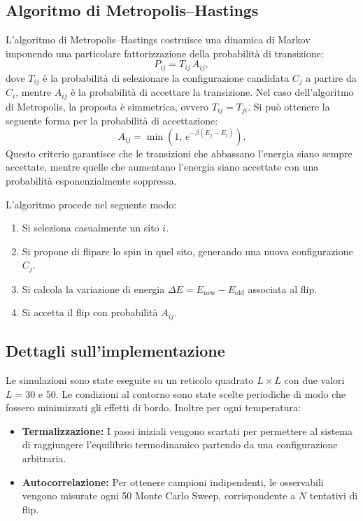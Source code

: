 \subsection{Algoritmo di Metropolis--Hastings}

L'algoritmo di Metropolis--Hastings costruisce una dinamica di Markov imponendo una 
particolare fattorizzazione della probabilità di transizione:
\begin{equation}
P_{ij} = T_{ij}\, A_{ij},
\end{equation}
dove $T_{ij}$ è la probabilità di selezionare la configurazione candidata $C_j$ a 
partire da $C_i$, mentre $A_{ij}$ è la probabilità di accettare la transizione. 
Nel caso dell'algoritmo di Metropolis, la proposta è simmetrica, ovvero $T_{ij} = T_{ji}$.
Si può ottenere la seguente forma per la probabilità di accettazione:
\begin{equation}
A_{ij} = \min\left(1,\, e^{-\beta (E_j - E_i)}\right).
\end{equation}
Questo criterio garantisce che le transizioni che abbassano l'energia siano sempre 
accettate, mentre quelle che aumentano l'energia siano accettate con una probabilità 
esponenzialmente soppressa.

L'algoritmo procede nel seguente modo:
\begin{enumerate}
    \item Si seleziona casualmente un sito $i$.
    \item Si propone di flipare lo spin in quel sito, generando una nuova configurazione $C_j$.
    \item Si calcola la variazione di energia $\Delta E = E_{\text{new}} - E_{\text{old}}$ 
    associata al flip.
    \item Si accetta il flip con probabilità $A_{ij}$.
\end{enumerate}

\subsection{Dettagli sull'implementazione}

Le simulazioni sono state eseguite su un reticolo quadrato $L \times L$ con due valori $L = 30$ e $50$. Le condizioni al contorno sono state scelte periodiche di modo che fossero minimizzati gli effetti di bordo.
Inoltre per ogni temperatura:
\begin{itemize}
    \item \textbf{Termalizzazione:} I passi iniziali vengono scartati per permettere al sistema di raggiungere l'equilibrio termodinamico partendo da una configurazione arbitraria.
    \item \textbf{Autocorrelazione:} Per ottenere campioni indipendenti, le osservabili vengono misurate ogni 50 Monte Carlo Sweep, corrispondente a $N$ tentativi di flip.
\end{itemize}

